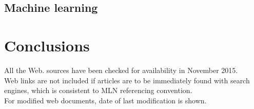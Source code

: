 \documentclass[12pt,twoside,a4paper]{article}
\begin{document}
\subsection{Machine learning}
\section{Conclusions}






All the Web. sources have been checked for availability in November 2015.\\
Web links are not included if articles are to be immediately found with search engines, which is consistent to MLN referencing convention.\\
For modified web documents, date of last modification is shown.
\end{document}
